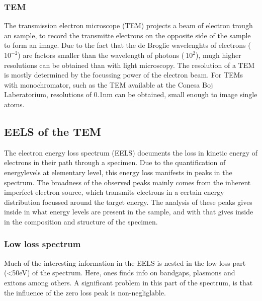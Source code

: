 \subsubsection{TEM} %
\label{ssub:tem}
The transmission electron microscope (TEM) projects a beam of electron trough an sample, to record the transmitte electrons on the opposite side of the sample to form an image. Due to the fact that the de Broglie wavelenghts of electrons (~$10^{-2}$) are factors smaller than the wavelength of photons ($~10^2$), mugh higher resolutions can be obtained than with light microscopy. The resolution of a TEM is mostly determined by the focussing power of the electron beam. For TEMs with monochromator, such as the TEM available at the Conesa Boj Laberatorium, resolutions of 0.1nm can be obtained, small enough to image single atoms.




\subsection{EELS of the TEM}
The electron energy loss spectrum (EELS) documents the loss in kinetic energy of electrons in their path through a specimen. Due to the quantification of energylevels at elementary level, this energy loss manifests in peaks in the spectrum. The broadness of the observed peaks mainly comes from the inherent imperfect electron source, which transmits electrons in a certain energy distribution focussed around the target energy. The analysis of these peaks gives inside in what energy levels are present in the sample, and with that gives inside in the composition and structure of the specimen.




\subsubsection{Low loss spectrum}
Much of the interesting information in the EELS is nested in the low loss part (<50eV) of the spectrum. Here, ones finds info on bandgaps, plasmons and exitons among others. A significant problem in this part of the spectrum, is that the influence of the zero loss peak is non-negliglable. 